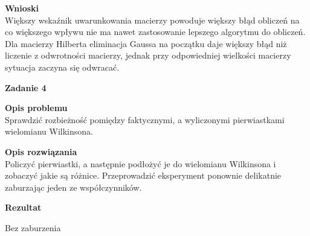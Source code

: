 \documentclass{article}
\begin{document}
\pagebreak

\noindent \textbf{Wnioski} \\
Większy wskaźnik uwarunkowania macierzy powoduje większy błąd obliczeń na co
większego wpływu nie ma nawet zastosowanie lepszego algorytmu do obliczeń. Dla macierzy
Hilberta eliminacja Gaussa na początku daje większy błąd niż liczenie z odwrotności macierzy,
jednak przy odpowiedniej wielkości macierzy sytuacja zaczyna się odwracać.

\noindent \textbf{\large Zadanie 4}

\noindent \textbf{Opis problemu} \\
Sprawdzić rozbieżność pomiędzy faktycznymi, a wyliczonymi pierwiastkami
wielomianu Wilkinsona.

\noindent \textbf{Opis rozwiązania} \\
Policzyć pierwiastki, a następnie podłożyć je do wielomianu Wilkinsona i zobaczyć
jakie są różnice. Przeprowadzić eksperyment ponownie delikatnie zaburzając jeden
ze współczynników.

\noindent \textbf{Rezultat}

\noindent Bez zaburzenia
\end{document}
